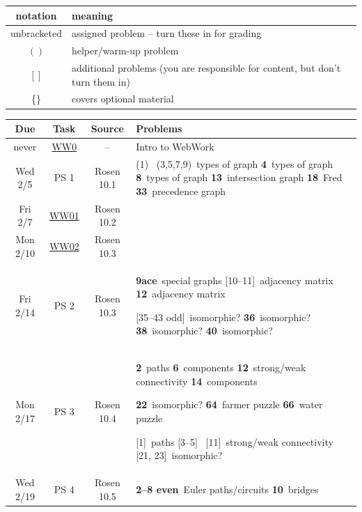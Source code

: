 \documentclass{article}
\def\WW#1{\href{https://mathwebwork.cs.calvin.edu/webwork2/Math252-S20-Pruim/WW#1}{WW#1}}
\def\hwn#1{\relax}
\def\hwn#1{\ {\tiny (#1)}}
\def\hwn#1{$_{\mbox{\ \tiny #1}}$}
\def\hwn#1{~{\tiny #1}}
\newcommand{\helper}[2][\relax]{(#2)\hwn{#1}}
\newcommand{\extra}[2][\relax]{[#2]\hwn{#1}}
\newcommand{\mand}[2][\relax]{{\bf \large #2}\hwn{#1}}
\begin{document}
\begin{center}

\iftrue

\begin{longtable}{|c|l|}
  \hline
  notation & meaning \\
  \hline
  unbracketed & assigned problem -- turn these in for grading \\
  $()$ & helper/warm-up problem  \\
  $[]$ & additional problems (you are responsible for content, but don't turn them in) \\
  \{\} & covers optional material \\
  \hline
\end{longtable}
\fi

\bigskip


\begin{longtable}{|c|c|c|p{4.3in}|}
  \hline
  Due & Task & Source & Problems \\
  \hline\hline
  \endhead
     never & \WW{0} & -- & Intro to WebWork
     \\
     \hline
  	 Wed 2/5 & PS 1 & Rosen 10.1 &
	 \helper{1}
	 \helper[types of graph]{3,5,7,9}
	 \mand[types of graph]{4}
	 \mand[types of graph]{8}
	 \mand[intersection graph]{13}
	 \mand[Fred]{18}
	 \mand[precedence graph]{33}
	 \\
	 \hline
	 Fri 2/7 & \WW{01} & Rosen 10.2 &
	 \\
	 \hline
	 Mon 2/10 & \WW{02} & Rosen 10.3 &
     \\
     \hline
  	 Fri 2/14 & PS 2 & Rosen 10.3 &  %
  	 \mand[special graphs]{9ace}
  	 \extra[adjacency matrix]{10--11}
  	 \mand[adjacency matrix]{12}

  	 \extra[isomorphic?]{35--43 odd}
  	 \mand[isomorphic?]{36}
  	 \mand[isomorphic?]{38}
  	 \mand[isomorphic?]{40}
	 \\
	 \hline
	 Mon 2/17 & PS 3 & Rosen 10.4 &
	 \mand[paths]{2}
	 \mand[components]{6}
	 \mand[strong/weak connectivity]{12}
	 \mand[components]{14}

	 \mand[isomorphic?]{22}
	 \mand[farmer puzzle]{64}
	 \mand[water puzzle]{66}

	 \extra[paths]{1}
	 \extra{3--5}
	 \extra[strong/weak connectivity]{11}
	 \extra[isomorphic?]{21, 23}
	 \\
	 \hline
	 Wed 2/19 & PS 4 & Rosen 10.5 &
	 \mand[Euler paths/circuits]{2--8 even}
	 \mand[bridges]{10}


\end{longtable}
\end{center}
\end{document}
